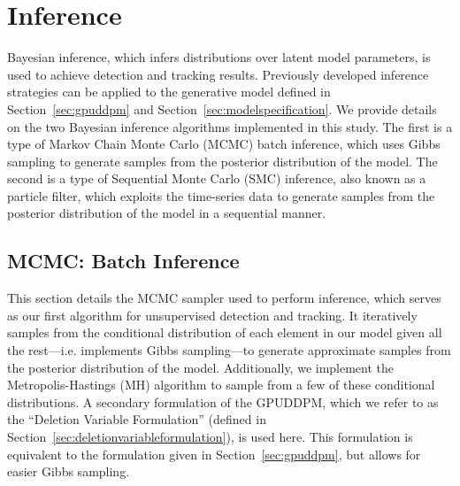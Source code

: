 \documentclass[twocolumn, final]{svjour3}
\begin{document}




\section{Inference}
\label{sec:inference}

Bayesian inference, which infers distributions over latent model parameters, is used to achieve detection and tracking results. Previously developed inference strategies can be applied to the generative model defined in Section~\ref{sec:gpuddpm} and Section~\ref{sec:modelspecification}. We provide details on the two Bayesian inference algorithms implemented in this study. The first is a type of Markov Chain Monte Carlo (MCMC) batch inference, which uses Gibbs sampling to generate samples from the posterior distribution of the model. The second is a type of Sequential Monte Carlo (SMC) inference, also known as a particle filter, which exploits the time-series data to generate samples from the posterior distribution of the model in a sequential manner.


\subsection{MCMC: Batch Inference}
\label{sec:MCMC}

This section details the MCMC sampler used to perform inference, which serves as our first algorithm for unsupervised detection and tracking. It iteratively samples from the conditional distribution of each element in our model given all the rest---i.e. implements Gibbs sampling---to generate approximate samples from the posterior distribution of the model. Additionally, we implement the Metropolis-Hastings (MH) algorithm to sample from a few of these conditional distributions. A secondary formulation of the GPUDDPM, which we refer to as the ``Deletion Variable Formulation'' (defined in Section~\ref{sec:deletionvariableformulation}), is used here. This formulation is equivalent to the formulation given in Section~\ref{sec:gpuddpm}, but allows for easier Gibbs sampling.
\end{document}
